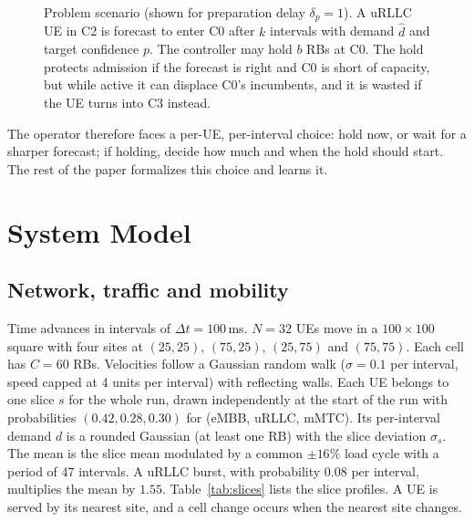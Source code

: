 \documentclass[conference]{IEEEtran}
\begin{document}
\begin{figure}[!t]
\caption{Problem scenario (shown for preparation delay $\delta_p=1$). A uRLLC UE in C2 is forecast to enter C0 after $k$ intervals with demand $\hat d$ and target confidence $p$. The controller may hold $b$ RBs at C0. The hold protects admission if the forecast is right and C0 is short of capacity, but while active it can displace C0's incumbents, and it is wasted if the UE turns into C3 instead.}
\label{fig:scenario}
\end{figure}

The operator therefore faces a per-UE, per-interval choice: hold now, or wait for a sharper forecast; if holding, decide how much and when the hold should start. The rest of the paper formalizes this choice and learns it.

\section{System Model}\label{sec:model}
\subsection{Network, traffic and mobility}
Time advances in intervals of $\Delta t=100$\,ms. $N=32$ UEs move in a $100\times100$ square with four sites at $(25,25)$, $(75,25)$, $(25,75)$ and $(75,75)$. Each cell has $C=60$ RBs. Velocities follow a Gaussian random walk ($\sigma=0.1$ per interval, speed capped at 4 units per interval) with reflecting walls. Each UE belongs to one slice $s$ for the whole run, drawn independently at the start of the run with probabilities $(0.42,0.28,0.30)$ for (eMBB, uRLLC, mMTC). Its per-interval demand $d$ is a rounded Gaussian (at least one RB) with the slice deviation $\sigma_s$. The mean is the slice mean modulated by a common $\pm16\%$ load cycle with a period of 47 intervals. A uRLLC burst, with probability $0.08$ per interval, multiplies the mean by $1.55$. Table~\ref{tab:slices} lists the slice profiles. A UE is served by its nearest site, and a cell change occurs when the nearest site changes.
\end{document}
